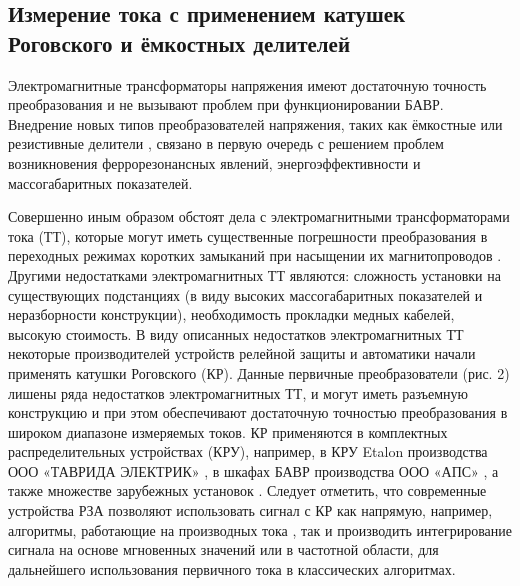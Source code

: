 
\subsection{Измерение тока с применением катушек Роговского и ёмкостных делителей}
\label{sec:ch1_rogowski_and_capacitive}

Электромагнитные трансформаторы напряжения имеют достаточную точность преобразования и
не вызывают проблем при функционировании БАВР. Внедрение новых типов преобразователей
напряжения, таких как ёмкостные \cite{bavr_bib_125_e_2014,bavr_bib_126_roman_2020} или
резистивные делители \cite{bavr_bib_127_tobias_2023,bavr_bib_128_you_2011}, связано в
первую очередь с решением проблем возникновения феррорезонансных явлений,
энергоэффективности и массогабаритных показателей.

Совершенно иным образом обстоят дела с электромагнитными трансформаторами тока (ТТ),
которые могут иметь существенные погрешности преобразования в переходных режимах
коротких замыканий при насыщении их магнитопроводов
\cite{bavr_bib_129_grechukhin_2006,bavr_bib_130_klimenko_2013,bavr_bib_131_kuzhekov_2020}.
Другими недостатками электромагнитных ТТ являются: сложность установки на существующих
подстанциях (в виду высоких массогабаритных показателей и неразборности конструкции),
необходимость прокладки медных кабелей, высокую стоимость. В виду описанных недостатков
электромагнитных ТТ некоторые производителей устройств релейной защиты и автоматики
начали применять катушки Роговского (КР). Данные первичные преобразователи (рис. 2)
лишены ряда недостатков электромагнитных ТТ, и могут иметь разъемную конструкцию и при
этом обеспечивают достаточную точностью преобразования в широком диапазоне измеряемых
токов. КР применяются в комплектных распределительных устройствах (КРУ), например, в КРУ
Etalon производства ООО «ТАВРИДА ЭЛЕКТРИК» \cite{bavr_bib_122_rukovodstvo_nd}, в шкафах
БАВР производства ООО «АПС»
\cite{bavr_bib_003_operating_2023,bavr_bib_004_operating_2024}, а также множестве
зарубежных установок
\cite{bavr_bib_132_pc_2021,bavr_bib_133_zhang_2014,bavr_bib_134_esa_2009,bavr_bib_135_peng_2007,bavr_bib_136_lj_2007}.
Следует отметить, что современные устройства РЗА позволяют использовать сигнал с КР как
напрямую, например, алгоритмы, работающие на производных тока
\cite{bavr_bib_119_yu_1998,bavr_bib_120_siamak_2020,bavr_bib_121_chothani_2014}, так и
производить интегрирование сигнала на основе мгновенных значений или в частотной
области, для дальнейшего использования первичного тока в классических алгоритмах.

